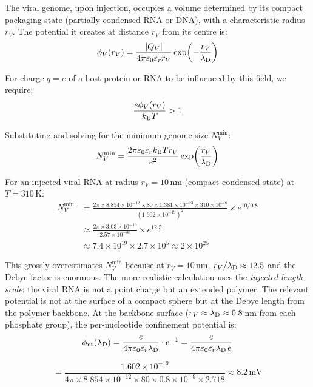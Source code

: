 The viral genome, upon injection, occupies a volume determined by its compact packaging state (partially condensed RNA or DNA), with a characteristic radius $r_V$. The potential it creates at distance $r_V$ from its centre is:
\begin{equation}
  \phi_V(r_V) = \frac{\abs{Q_V}}{4\pi \varepsilon_{0} \varepsilon_r r_V} \exp\!\left(-\frac{r_V}{\lambda_{\mathrm{D}}}\right)
\end{equation}

For charge $q = e$ of a host protein or RNA to be influenced by this field, we require:
\begin{equation}
  \frac{e \phi_V(r_V)}{k_{\mathrm{B}} T} > 1
\end{equation}

Substituting and solving for the minimum genome size $N_V^{\min}$:
\begin{equation}
  N_V^{\min} = \frac{2\pi \varepsilon_{0} \varepsilon_r k_{\mathrm{B}} T r_V}{e^2} \exp\!\left(\frac{r_V}{\lambda_{\mathrm{D}}}\right)
  \label{v:eq:Nmin}
\end{equation}

For an injected viral RNA at radius $r_V = 10$\,nm (compact condensed state) at $T = 310$\,K:
\begin{align}
  N_V^{\min} &= \frac{2\pi \times 8.854 \times 10^{-12} \times 80 \times 1.381 \times 10^{-23} \times 310 \times 10^{-8}}{(1.602 \times 10^{-19})^2} \times e^{10/0.8} \\
  &\approx \frac{2\pi \times 3.03 \times 10^{-19}}{2.57 \times 10^{-38}} \times e^{12.5} \\
  &\approx 7.4 \times 10^{19} \times 2.7 \times 10^5 \approx 2 \times 10^{25}
\end{align}

This grossly overestimates $N_V^{\min}$ because at $r_V = 10$\,nm, $r_V/\lambda_{\mathrm{D}} \approx 12.5$ and the Debye factor is enormous. The more realistic calculation uses the \emph{injected length scale}: the viral RNA is not a point charge but an extended polymer. The relevant potential is not at the surface of a compact sphere but at the Debye length from the polymer backbone. At the backbone surface ($r_V \approx \lambda_{\mathrm{D}} \approx 0.8$\,nm from each phosphate group), the per-nucleotide confinement potential is:
\begin{equation}
  \phi_{\mathrm{nt}}(\lambda_{\mathrm{D}}) = \frac{e}{4\pi \varepsilon_{0} \varepsilon_r \lambda_{\mathrm{D}}} \cdot e^{-1} = \frac{e}{4\pi \varepsilon_{0} \varepsilon_r \lambda_{\mathrm{D}} \, \mathrm{e}}
\end{equation}

\begin{equation}
  = \frac{1.602 \times 10^{-19}}{4\pi \times 8.854 \times 10^{-12} \times 80 \times 0.8 \times 10^{-9} \times 2.718} \approx 8.2\,\mathrm{mV}
\end{equation}

